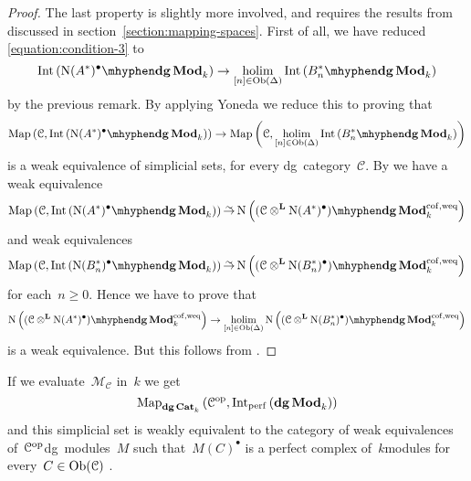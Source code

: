 \begin{refsection}
\begin{theorem}
\begin{proof}[Proof]
    The last property is slightly more involved, and requires the results from \cite{toen} discussed in section~\ref{section:mapping-spaces}. First of all, we have reduced \eqref{equation:condition-3} to
    \begin{equation}
      \Int\left( \dgMod{\nerve(A^*)^\bullet}_k \right)\to\holim_{[n]\in\Ob(\Delta)}\Int\left( \dgMod{B_n^*}_k \right)
    \end{equation}
    by the previous remark. By applying Yoneda we reduce this to proving that
    \begin{equation}
      \Map\left( \mathcal{C},\Int\left( \dgMod{\nerve(A^*)^\bullet}_k \right) \right)\to\Map\left( \mathcal{C},\holim_{[n]\in\Ob(\Delta)}\Int\left( \dgMod{B_n^*}_k \right) \right)
    \end{equation}
    is a weak equivalence of simplicial sets, for every dg~category~$\mathcal{C}$. By \cite[theorem 4.2]{toen} we have a weak equivalence
    \begin{equation}
      \Map\left( \mathcal{C},\Int\left( \dgMod{\nerve(A^*)^\bullet}_k \right) \right)\weq\nerve\left( \dgMod{(\mathcal{C}\otimes^{\mathbf{L}}\nerve(A^*)^\bullet)}_k^{\mathrm{cof,weq}} \right)
    \end{equation}
    and weak equivalences
    \begin{equation}
      \Map\left( \mathcal{C},\Int\left( \dgMod{\nerve(B_n^*)^\bullet}_k \right) \right)\weq\nerve\left( \dgMod{(\mathcal{C}\otimes^{\mathbf{L}}\nerve(B_n^*)^\bullet)}_k^{\mathrm{cof,weq}} \right)
    \end{equation}
    for each~$n\geq 0$. Hence we have to prove that
    \begin{equation}
      \nerve\left( \dgMod{(\mathcal{C}\otimes^{\mathbf{L}}\nerve(A^*)^\bullet)}_k^{\mathrm{cof,weq}} \right)\to\holim_{[n]\in\Ob(\Delta)}\nerve\left( \dgMod{(\mathcal{C}\otimes^{\mathbf{L}}\nerve(B_n^*)^\bullet)}_k^{\mathrm{cof,weq}} \right)
    \end{equation}
    is a weak equivalence. But this follows from \cite[corollary B.0.8]{hagII}.
  \end{proof}
\end{theorem}

\begin{example}
  If we evaluate~$\mathcal{M}_{\mathcal{C}}$ in~$k$ we get
  \begin{equation}
    \Map_{\dgCat_k}\left( \mathcal{C}^\opp,\Int_\perf\left( \dgMod_k \right) \right)
  \end{equation}
  and this simplicial set is weakly equivalent to the category of weak equivalences of~$\mathcal{C}^{\mathrm{op}}$\dash dg~modules~$M$ such that~$M(C)^\bullet$ is a perfect complex of~$k$\dash modules for every~$C\in\operatorname{Ob}(\mathcal{C})$ \cite[corollary 7.6]{toen}.
\end{example}



\end{refsection}
